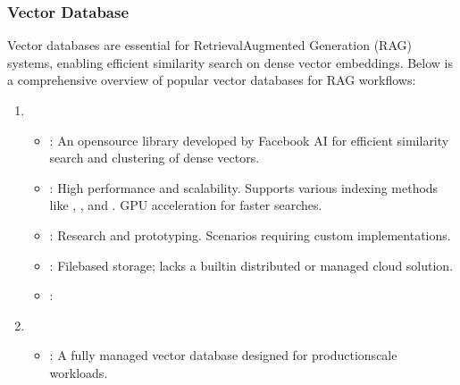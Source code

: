 \documentclass[letterpaper,11pt,english]{sphinxmanual}
\begin{document}
\subsubsection{Vector Database}
\label{\detokenize{rag:vector-database}}
\sphinxAtStartPar
Vector databases are essential for Retrieval\sphinxhyphen{}Augmented Generation (RAG) systems, enabling
efficient similarity search on dense vector embeddings. Below is a comprehensive overview
of popular vector databases for RAG workflows:
\begin{enumerate}
%
\item {} 
\sphinxAtStartPar
{}
\begin{itemize}
\item {} 
\sphinxAtStartPar
{}:
\sphinxhyphen{} An open\sphinxhyphen{}source library developed by Facebook AI for efficient similarity search and clustering of dense vectors.

\item {} 
\sphinxAtStartPar
{}:
\sphinxhyphen{} High performance and scalability.
\sphinxhyphen{} Supports various indexing methods like , , and .
\sphinxhyphen{} GPU acceleration for faster searches.

\item {} 
\sphinxAtStartPar
{}:
\sphinxhyphen{} Research and prototyping.
\sphinxhyphen{} Scenarios requiring custom implementations.

\item {} 
\sphinxAtStartPar
{}:
\sphinxhyphen{} File\sphinxhyphen{}based storage; lacks a built\sphinxhyphen{}in distributed or managed cloud solution.

\item {} 
\sphinxAtStartPar
{}: 

\end{itemize}

\item {} 
\sphinxAtStartPar
{}
\begin{itemize}
\item {} 
\sphinxAtStartPar
{}:
\sphinxhyphen{} A fully managed vector database designed for production\sphinxhyphen{}scale workloads.


\end{itemize}
\end{enumerate}
\end{document}
